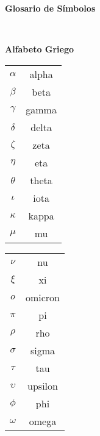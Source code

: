 \documentclass[a4,paper]{article}
\begin{document}
	
\begin{center}
	{\Huge \bf Glosario de Símbolos}
\end{center}
\ \\[5mm]
\begin{center}
	{\Large \bf Alfabeto Griego}
\end{center}
\begin{multicols}{2}
\begin{tabular}{cc}
	$ \alpha $	&  alpha\\ 
	
	$ \beta $&  beta \\ 
	$ \gamma $&  gamma\\ 
	
	$ \delta $& delta  \\ 
	
	$ \zeta $& zeta  \\ 
	
	$ \eta $&  eta\\ 
	
	$ \theta $& theta  \\ 
	
	$ \iota $	& iota \\ 
	
	$ \kappa $ & kappa  \\ 
	
	$ \mu $	& mu  \\ 
	
\end{tabular} 
\columnbreak
\begin{tabular}{cc}
	
	$ \nu $	&  nu\\ 
	
	$ \xi $&  xi \\ 
	$ o$&  omicron\\ 
	
	$ \pi $& pi  \\ 
	
	$ \rho $& rho  \\ 
	
	$ \sigma $&  sigma\\ 
	
	$ \tau $& tau  \\ 
	
	$ \upsilon $	& upsilon \\ 
	
	$ \phi $ & phi  \\ 
	
	$ \omega $	& omega  \\ 
	
\end{tabular} 

\end{multicols}
\end{document}
